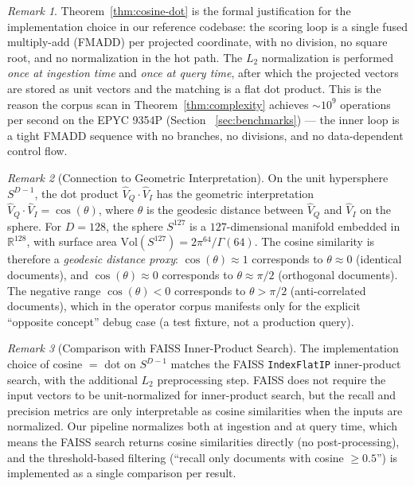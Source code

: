 \documentclass[10pt,twocolumn]{article}
\theoremstyle{definition}
\theoremstyle{remark}
\newtheorem{remark}{Remark}
\begin{document}
\begin{remark}
Theorem~\ref{thm:cosine-dot} is the formal justification for the
implementation choice in our reference codebase: the scoring loop is
a single fused multiply-add (FMADD) per projected coordinate, with no
division, no square root, and no normalization in the hot path. The
$L_2$ normalization is performed \emph{once at ingestion time} and
\emph{once at query time}, after which the projected vectors are stored
as unit vectors and the matching is a flat dot product. This is the
reason the corpus scan in Theorem~\ref{thm:complexity} achieves
$\sim 10^9$ operations per second on the EPYC 9354P (Section~
\ref{sec:benchmarks}) — the inner loop is a tight FMADD sequence with
no branches, no divisions, and no data-dependent control flow.
\end{remark}

\begin{remark}[Connection to Geometric Interpretation]
\label{rem:geometric}
On the unit hypersphere $S^{D-1}$, the dot product $\hat{V}_Q \cdot
\hat{V}_I$ has the geometric interpretation
$\hat{V}_Q \cdot \hat{V}_I = \cos(\theta)$, where $\theta$ is the
geodesic distance between $\hat{V}_Q$ and $\hat{V}_I$ on the sphere.
For $D = 128$, the sphere $S^{127}$ is a $127$-dimensional manifold
embedded in $\mathbb{R}^{128}$, with surface area
$\mathrm{Vol}(S^{127}) = 2 \pi^{64} / \Gamma(64)$. The cosine
similarity is therefore a \emph{geodesic distance proxy}: $\cos(\theta)
\approx 1$ corresponds to $\theta \approx 0$ (identical documents),
and $\cos(\theta) \approx 0$ corresponds to $\theta \approx \pi/2$
(orthogonal documents). The negative range $\cos(\theta) < 0$
corresponds to $\theta > \pi/2$ (anti-correlated documents), which in
the operator corpus manifests only for the explicit ``opposite concept''
debug case (a test fixture, not a production query).
\end{remark}

\begin{remark}[Comparison with FAISS Inner-Product Search]
\label{rem:faiss-comparison}
The implementation choice of cosine $=$ dot on $S^{D-1}$ matches the
FAISS \texttt{IndexFlatIP} inner-product search, with the additional
$L_2$ preprocessing step. FAISS does not require the input vectors to
be unit-normalized for inner-product search, but the recall and
precision metrics are only interpretable as cosine similarities when
the inputs are normalized. Our pipeline normalizes both at ingestion
and at query time, which means the FAISS search returns cosine
similarities directly (no post-processing), and the threshold-based
filtering (``recall only documents with cosine $\ge 0.5$'') is
implemented as a single comparison per result.
\end{remark}
\end{document}
